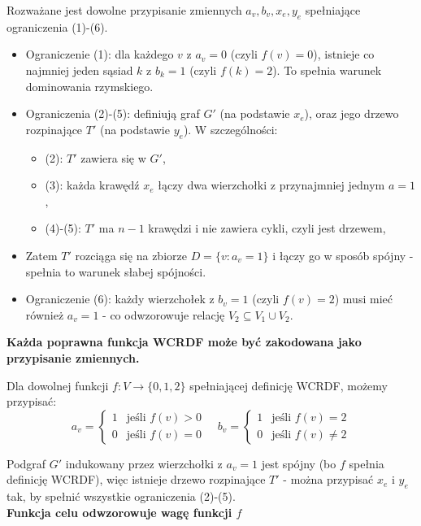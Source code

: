Rozważane jest dowolne przypisanie zmiennych $a_v, b_v, x_e, y_e$ spełniające ograniczenia (1)-(6).

\begin{itemize}
    \item Ograniczenie (1): dla każdego $v$ z $a_v = 0$ (czyli $f(v) = 0$), istnieje co najmniej jeden sąsiad $k$ z $b_k = 1$ (czyli $f(k) = 2$). To spełnia warunek dominowania rzymskiego.
    
    \item Ograniczenia (2)-(5): definiują graf $G'$ (na podstawie $x_e$), oraz jego drzewo rozpinające $T'$ (na podstawie $y_e$). W szczególności:
    \begin{itemize}
        \item (2): $T'$ zawiera się w $G'$,
        \item (3): każda krawędź $x_e$ łączy dwa wierzchołki z przynajmniej jednym $a = 1$,
        \item (4)-(5): $T'$ ma $n-1$ krawędzi i nie zawiera cykli, czyli jest drzewem,
    \end{itemize}
    \item Zatem $T'$ rozciąga się na zbiorze $D = \{v : a_v = 1\}$ i łączy go w sposób spójny - spełnia to warunek słabej spójności.
    
    \item Ograniczenie (6): każdy wierzchołek z $b_v = 1$ (czyli $f(v) = 2$) musi mieć również $a_v = 1$ - co odwzorowuje relację $V_2 \subseteq V_1 \cup V_2$.
\end{itemize}
\textbf{Każda poprawna funkcja WCRDF może być zakodowana jako przypisanie zmiennych.}

Dla dowolnej funkcji $f : V \to \{0,1,2\}$ spełniającej definicję WCRDF, możemy przypisać:
\[
a_v = \begin{cases}
1 & \text{jeśli } f(v) > 0 \\
0 & \text{jeśli } f(v) = 0
\end{cases}
\quad
b_v = \begin{cases}
1 & \text{jeśli } f(v) = 2 \\
0 & \text{jeśli } f(v) \ne 2
\end{cases}
\]

Podgraf $G'$ indukowany przez wierzchołki z $a_v = 1$ jest spójny (bo $f$ spełnia definicję WCRDF), więc istnieje drzewo rozpinające $T'$ - można przypisać $x_e$ i $y_e$ tak, by spełnić wszystkie ograniczenia (2)-(5).\\
\textbf{Funkcja celu odwzorowuje wagę funkcji $f$}

